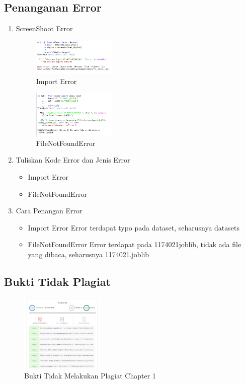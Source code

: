 \subsection{Penanganan Error}
\begin{enumerate}
	\item ScreenShoot Error
	\begin{figure}[H]
		\includegraphics[width=4cm]{figures/1174021/tugas1/error/1.PNG}
		\centering
		\caption{Import Error}
	\end{figure}
	\begin{figure}[H]
		\includegraphics[width=4cm]{figures/1174021/tugas1/error/2.PNG}
		\centering
		\caption{FileNotFoundError}
	\end{figure}
	\item Tuliskan Kode Error dan Jenis Error
	\begin{itemize}
		\item Import Error
		\item FileNotFoundError
	\end{itemize}
	\item Cara Penangan Error
	\begin{itemize}
		\item Import Error
		\hfill\break
		Error terdapat typo pada dataset, seharusnya datasets
		\item FileNotFoundError
		\hfill\break
		Error terdapat pada 1174021joblib, tidak ada file yang dibaca, seharusnya 1174021.joblib
	\end{itemize}
\end{enumerate}
\subsection{Bukti Tidak Plagiat}
\begin{figure}[H]
	\includegraphics[width=4cm]{figures/1174021/tugas1/buktiplagiat/1.PNG}
	\centering
	\caption{Bukti Tidak Melakukan Plagiat Chapter 1}
\end{figure}